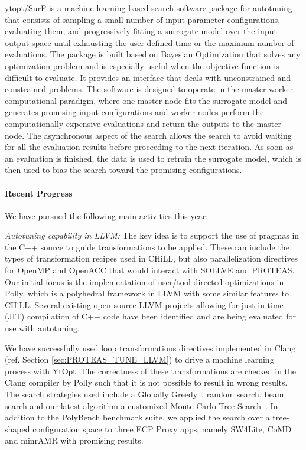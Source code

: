 ytopt/SurF is a machine-learning-based search software package for autotuning that consists of sampling a small number of input parameter configurations, evaluating them, and progressively fitting a surrogate model over the input-output space until exhausting the user-defined time or the maximum number of evaluations. The package is built based on Bayesian Optimization that solves any optimization problem and is especially useful when the objective function is difficult to evaluate. It provides an interface that deals with unconstrained and constrained problems. The software is designed to operate in the master-worker computational paradigm, where one master node fits the surrogate model and generates promising input configurations and worker nodes perform the computationally expensive evaluations and return the outputs to the master node. The asynchronous aspect of the search allows the search to avoid waiting for all the evaluation results before proceeding to the next iteration. As soon as an evaluation is finished, the data is used to retrain the surrogate model, which is then used to bias the search toward the promising configurations.


\paragraph{Recent Progress}


We have pursued the following main activities this year:

\textit{Autotuning capability in LLVM:}
The key idea is to support the use of pragmas in the C++ source to guide transformations to be applied. These can include the types of transformation recipes used in CHiLL, but also parallelization directives for OpenMP and OpenACC that would interact with SOLLVE and PROTEAS. Our initial focus is the implementation of user/tool-directed optimizations in Polly, which is a polyhedral framework in LLVM with some similar features to CHiLL. Several existing open-source LLVM projects allowing for just-in-time (JIT) compilation of C++ code have been identified and are being evaluated for use with autotuning. 

We have successfully used loop transformations directives implemented in Clang (ref. Section \ref{sec:PROTEAS_TUNE_LLVM}) to drive a machine learning process with YtOpt. The correctness of these transformations are checked in the Clang compiler by Polly such that it is not possible to result in wrong results. The search strategies used include a Globally Greedy~\cite{kruse2020search}, random search, beam search and our latest algorithm a customized Monte-Carlo Tree Search~\cite{wu2021autotuning}.
In addition to the PolyBench benchmark suite, we applied the search over a tree-shaped configuration space to three ECP Proxy apps, namely SW4Lite, CoMD and minrAMR with promising results.


